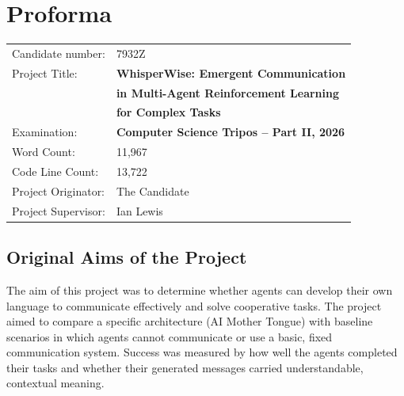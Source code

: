 \documentclass[12pt,a4paper,twoside,openright]{report}
\begin{document}
\chapter*{Proforma}
 {\large
  \begin{tabular}{ll}
	  Candidate number:   & 7932Z                                      \\
	  Project Title:      & \bf WhisperWise: Emergent Communication
                            \\ & \bf in Multi-Agent Reinforcement Learning
                            \\ & \bf for Complex Tasks \\
	  Examination:        & \bf Computer Science Tripos -- Part II, 2026 \\
	  Word Count:         & 11,967\footnotemark[1]                        \\
	  Code Line Count:    & 13,722\footnotemark[2]                         \\
	  Project Originator: & The Candidate         \\
	  Project Supervisor: & Ian Lewis                 \\
  \end{tabular}
 }

\section*{Original Aims of the Project}


The aim of this project was to determine whether agents can develop their own language to communicate effectively and solve cooperative tasks.
The project aimed to compare a specific architecture (AI Mother Tongue) with baseline scenarios in which agents cannot communicate or use a basic, fixed communication system.
Success was measured by how well the agents completed their tasks and whether their generated messages carried understandable, contextual meaning.
\end{document}
